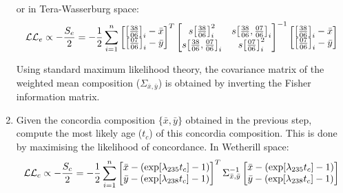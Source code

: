 \begin{refsection}
\begin{enumerate}
    or in Tera-Wasserburg space:
        \begin{equation}
    \mathcal{LL}_e \propto - \frac{S_e}{2} =
      -\frac{1}{2}\sum\limits_{i=1}^{n}
    \left[
      \begin{array}{@{}c@{}}
        \left[\frac{38}{06}\right]_i-\bar{x}\\
        \left[\frac{07}{06}\right]_i-\bar{y}
      \end{array}
      \right]^T
    \left[
      \begin{array}{@{}cc@{}}
        s\!\left[\frac{38}{06}\right]_i^2 &
        s\!\left[\frac{38}{06},\frac{07}{06}\right]_i\\
        s\!\left[\frac{38}{06},\frac{07}{06}\right]_i &
        s\!\left[\frac{07}{06}\right]_i^2
      \end{array}
      \right]^{-1}
    \left[
      \begin{array}{@{}c@{}}
        \left[\frac{38}{06}\right]_i-\bar{x}\\
        \left[\frac{07}{06}\right]_i-\bar{y}
      \end{array}
      \right]    
    \end{equation}

    Using standard maximum likelihood theory, the covariance matrix of
    the weighted mean composition ($\Sigma_{\bar{x},\bar{y}}$) is
    obtained by inverting the Fisher information matrix.
    
  \item Given the concordia composition $\{\bar{x},\bar{y}\}$ obtained
    in the previous step, compute the most likely age ($t_c$) of this
    concordia composition. This is done by maximising the likelihood
    of concordance. In Wetherill space:
        \begin{equation}
    \mathcal{LL}_c \propto - \frac{S_c}{2} =
      -\frac{1}{2}\sum\limits_{i=1}^{n}
    \left[
      \begin{array}{@{}c@{}}
        \bar{x} - (\exp[\lambda_{235}t_c] - 1)\\
        \bar{y} - (\exp[\lambda_{238}t_c] - 1)
      \end{array}
      \right]^T
    \Sigma_{\bar{x},\bar{y}}^{-1}
    \left[
      \begin{array}{@{}c@{}}
        \bar{x} - (\exp[\lambda_{235}t_c] - 1)\\
        \bar{y} - (\exp[\lambda_{238}t_c] - 1)
      \end{array}
      \right]
    \end{equation}


\end{enumerate}
\end{refsection}
